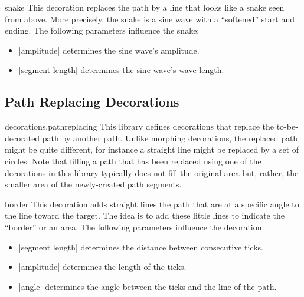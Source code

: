 \begin{decoration}{snake}
  This decoration replaces the path by a line that looks like a snake
  seen from above. More precisely, the snake is a sine wave with a
  ``softened'' start and ending. The following parameters influence
  the snake: 
  \begin{itemize}
  \item |amplitude|
    determines the sine wave's amplitude.
  \item |segment length|
    determines the sine wave's wave length.
  \end{itemize}
\begin{codeexample}[]
\end{codeexample}
\end{decoration}



  
\subsection{Path Replacing Decorations}

\begin{pgflibrary}{decorations.pathreplacing}
  This library defines decorations that replace the to-be-decorated
  path by another path. Unlike morphing decorations, the replaced path
  might be quite different, for instance a straight line might be
  replaced by a set of circles. Note that filling a path that has been
  replaced using one of the decorations in this library typically does
  not fill the original area but, rather, the smaller area of the
  newly-created path segments.
\end{pgflibrary}

\begin{decoration}{border}
  This decoration adds straight lines the path that are at a specific
  angle to the line toward the target. The idea is to add these little
  lines to indicate the ``border'' or an area. The following
  parameters influence the decoration:  
  \begin{itemize}
  \item |segment length|
    determines the distance between consecutive ticks.
  \item |amplitude|
    determines the length of the ticks.
  \item |angle|
    determines the angle between the ticks and the line of the path. 
  \end{itemize}
\begin{codeexample}[]
\end{codeexample}
\end{decoration}



